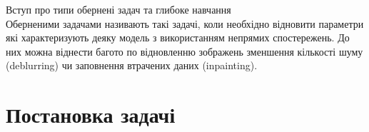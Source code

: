 \documentclass[14pt,a4paper]{extarticle}
\newcounter{e}
\numberwithin{equation}{section}
\numberwithin{figure}{section}
\begin{document}
	Вступ про типи обернені задач та глибоке навчання
	\\
	
	Оберненими задачами називають такі задачі, коли необхідно відновити параметри які характеризують деяку модель з використанням непрямих спостережень. До них можна віднести багото по відновленню зображень зменшення кількості шуму (deblurring) чи заповнення втрачених даних (inpainting).

	\begin{comment}
	"""
	http://repository.dnu.dp.ua:1100/upload/ddcba97cf65d7af08acc8b934080e148.pdf
	
	1) визначати механічні та теплофізичні властивості матеріалів, ідентифікув ати полімерні і композитні матеріали, біоматеріали, п'єзокерам ічні матеріали;
	2) розв’язувати задачі сейсморозвідки , а саме визначати розташування й
	потужності покладів корисних копалин за відбитими від родовища звуковими сиг
	налами;
	3) розв’язувати проблеми неруйнівного контролю, а саме визначати розташування й конфігурацію дефекту за виміряним на поверхні тіла полем пружних
	переміщень або за резонансними частотами;
	4) моделювати явища акустичної емісії та встановлювати зв'язок між осн ов
	ними характеристиками емісії та хар актеристиками напруженого стану, д ослід
	ження цього явища дозволяє виявити стан конструкції, що передує її руйнуванню;
	5) розв’язувати задачі рентгенівської й акустичної томографії.
	Вибираючи математичну модель, звичайно фіксують два етапи:
	1) вибір структури оператора A, що здійснює відображення входу xt на
	вихід yt;
	""'"
	content...
	\end{comment}


	
	\newpage
	\thispagestyle{empty}
	\section{Постановка задачі} 
	
	
	\begin{comment}
	"""
	Відповідно до поняття, уведеного на початку століття Ж. Адамаром, задачу
	z  Ru називають коректно поставленою, якщо вона задовольняє тр и умови:
	1) за кожного u U розв'язок задачі існує;
	2) розв'язок є єдиний за кожного u U ;
	3) розв'язок є стійкий до малих варіацій величини u , тобто достатньо малим
	зміненням величини u відповідають як завгодно малі зміни величини z [1, 7].
	Якщо задача не задовольняє хоча б одну із зазначених умов, то її називають некоректно поставленою.
	Очевидно тепер, що обернені задачі в розглянутих прикладах відносять до
	числа некоректно поставлених, оскільки в них порушується третя, а мо жливо, і
	перша із зазначених вище умов. Некоректність постановки обернен ої задачі і є її
	математична особливість. Якщо для пошуку наближеного розв’язку оберненої з адачі застосовувати будь-який класичний алгоритм формально, не враховуючи н екоректність постановки задачі, то є великий ризик отримати результат, який не
	має ні наукової, ні прикладної цінності.
	"""
	\end{comment}
	
\end{document}

